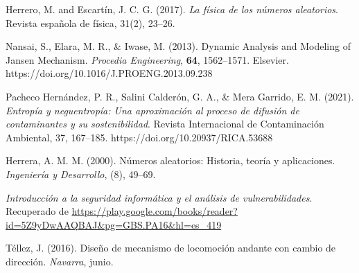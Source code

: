 \begin{thebibliography}{9}

Herrero, M. and Escartín, J. C. G. (2017). 
\emph{La física de los números aleatorios}. 
Revista española de física, 31(2), 23--26.

Nansai, S., Elara, M. R., \& Iwase, M. (2013). 
Dynamic Analysis and Modeling of Jansen Mechanism. 
\textit{Procedia Engineering}, \textbf{64}, 1562--1571. 
Elsevier. 
https://doi.org/10.1016/J.PROENG.2013.09.238

  
Pacheco Hernández, P. R., Salini Calderón, G. A., \& Mera Garrido, E. M. (2021). 
\textit{Entropía y neguentropía: Una aproximación al proceso de difusión de contaminantes y su sostenibilidad}. 
Revista Internacional de Contaminación Ambiental, 37, 167--185. 
https://doi.org/10.20937/RICA.53688

Herrera, A. M. M. (2000). Números aleatorios: Historia, teoría y aplicaciones. \textit{Ingeniería y Desarrollo}, (8), 49--69.

\textit{Introducción a la seguridad informática y el análisis de vulnerabilidades}. Recuperado de \url{https://play.google.com/books/reader?id=5Z9yDwAAQBAJ&pg=GBS.PA16&hl=es_419}


Téllez, J. (2016). Diseño de mecanismo de locomoción andante con cambio de dirección. \textit{Navarra}, junio.

\end{thebibliography}